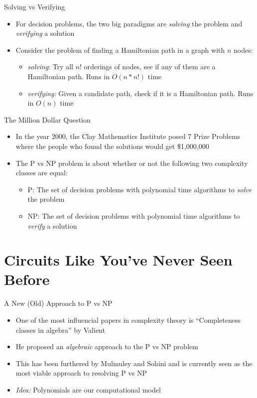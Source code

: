 \documentclass[aspectratio=169]{beamer}
\begin{document}
\begin{frame}{Solving vs Verifying}
    \begin{itemize}
        \item For decision problems, the two big paradigms are \emph{solving} the problem and \emph{verifying} a solution \pause
        \item Consider the problem of finding a Hamiltonian path in a graph with $n$ nodes:
        \begin{itemize}
            \item \emph{solving}: Try all $n!$ orderings of nodes, see if any of them are a Hamiltonian path. Runs in $O(n * n!)$ time \pause
            \item \emph{verifying:} Given a candidate path, check if it is a Hamiltonian path. Runs in $O(n)$ time 
        \end{itemize}
    \end{itemize}
\end{frame}

\begin{frame}{The Million Dollar Question}
    \begin{itemize}
        \item In the year 2000, the Clay Mathematics Institute posed 7 Prize Problems where the people who found the solutions would get \$1,000,000
        \item The P vs NP problem is about whether or not the following two complexity classes are equal: \pause
        \begin{itemize}
            \item P: The set of decision problems with polynomial time algorithms to \emph{solve} the problem
            \item NP: The set of decision problems with polynomial time algorithms to \emph{verify} a solution
        \end{itemize}
    \end{itemize}
\end{frame}

\section{Circuits Like You've Never Seen Before}
\frame{\sectionpage}

\begin{frame}{A New (Old) Approach to P vs NP}
    \begin{itemize}
        \item One of the most influencial papers in complexity theory is ``Completeness classes in algebra'' by Valient \cite{vp-vnp}
        \item He proposed an \emph{algebraic} approach to the P vs NP problem 
        \item This has been furthered by Mulmuley and Sohini and is currently seen as the most viable approach to resolving P vs NP \pause
        \item \emph{Idea:} Polynomials are our computational model
    \end{itemize}
\end{frame}
\end{document}

